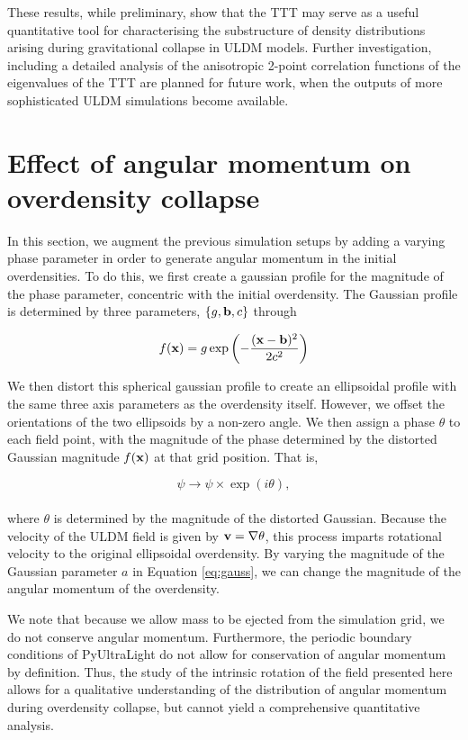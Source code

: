 \documentclass[a4paper,11pt]{article}
\begin{document}
These results, while preliminary, show that the TTT may serve as a useful quantitative tool for characterising the substructure of density distributions arising during gravitational collapse in ULDM models. Further investigation, including a detailed analysis of the anisotropic 2-point correlation functions of the eigenvalues of the TTT are planned for future work, when the outputs of more sophisticated ULDM simulations become available.





\section{Effect of angular momentum on overdensity collapse}\label{sec:rotation}

In this section, we augment the previous simulation setups by adding a varying phase parameter in order to generate angular momentum in the initial overdensities. To do this, we first create a gaussian profile for the magnitude of the phase parameter, concentric with the initial overdensity. The Gaussian profile is determined by three parameters, $\{g, \bold{b}, c\}$ through

\begin{equation}\label{eq:gauss}
    f(\bold{x}) = g\exp\left(-\frac{(\bold{x}-\bold{b})^2}{2c^2}\right)    
\end{equation}

We then distort this spherical gaussian profile to create an ellipsoidal profile with the same three axis parameters as the overdensity itself. However, we offset the orientations of the two ellipsoids by a non-zero angle. We then assign a phase $\theta$ to each field point, with the magnitude of the phase determined by the distorted Gaussian magnitude $f(\bold{x})$ at that grid position. That is,  

\begin{equation}
    \psi \rightarrow \psi \times \exp(i\theta),
\end{equation}
\\
where $\theta$ is determined by the magnitude of the distorted Gaussian. Because the velocity of the ULDM field is given by $\bold{v} = \bold{\nabla} \theta$, this process imparts rotational velocity to the original ellipsoidal overdensity. By varying the magnitude of the Gaussian parameter $a$ in Equation \ref{eq:gauss}, we can change the magnitude of the angular momentum of the overdensity.

We note that because we allow mass to be ejected from the simulation grid, we do not conserve angular momentum. Furthermore, the periodic boundary conditions of {\sc PyUltraLight} do not allow for conservation of angular momentum by definition. Thus, the study of the intrinsic rotation of the field presented here allows for a qualitative understanding of the distribution of angular momentum during overdensity collapse, but cannot yield a comprehensive quantitative analysis. 
\end{document}
